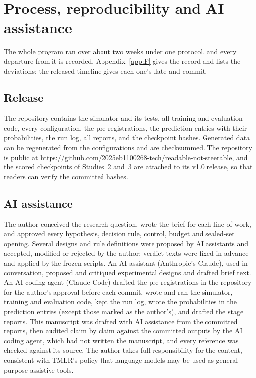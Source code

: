 \documentclass[10pt]{article}
\newcommand{\ReleaseStatement}{The repository is public at \url{https://github.com/2025eb1100268-tech/readable-not-steerable}, and the scored checkpoints of Studies~2 and~3 are attached to its v1.0 release, so that readers can verify the committed hashes.}
\newcommand{\ReleaseStatement}{An anonymized copy of the repository is provided as supplementary material.}
\begin{document}
\section{Process, reproducibility and AI assistance}\label{sec:8}

The whole program ran over about two weeks under one protocol, and every departure from it is recorded. Appendix~\ref{app:F} gives the record and lists the deviations; the released timeline gives each one's date and commit.

\subsection{Release}\label{sec:8.4}

The repository contains the simulator and its tests, all training and evaluation code, every configuration, the pre-registrations, the prediction entries with their probabilities, the run log, all reports, and the checkpoint hashes. Generated data can be regenerated from the configurations and are checksummed. \ReleaseStatement

\subsection{AI assistance}\label{sec:8.5}

The author conceived the research question, wrote the brief for each line of work, and approved every hypothesis, decision rule, control, budget and sealed-set opening. Several designs and rule definitions were proposed by AI assistants and accepted, modified or rejected by the author; verdict texts were fixed in advance and applied by the frozen scripts. An AI assistant (Anthropic's Claude), used in conversation, proposed and critiqued experimental designs and drafted brief text. An AI coding agent (Claude Code) drafted the pre-registrations in the repository for the author's approval before each commit, wrote and ran the simulator, training and evaluation code, kept the run log, wrote the probabilities in the prediction entries (except those marked as the author's), and drafted the stage reports. This manuscript was drafted with AI assistance from the committed reports, then audited claim by claim against the committed outputs by the AI coding agent, which had not written the manuscript, and every reference was checked against its source. The author takes full responsibility for the content, consistent with TMLR's policy that language models may be used as general-purpose assistive tools.
\end{document}
